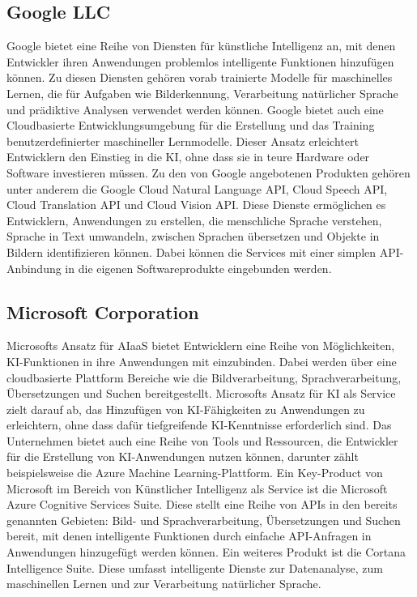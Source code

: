 \subsection{Google LLC}
Google bietet eine Reihe von Diensten für künstliche Intelligenz an, mit denen Entwickler ihren Anwendungen problemlos intelligente Funktionen hinzufügen können. Zu diesen Diensten gehören vorab trainierte Modelle für maschinelles Lernen, die für Aufgaben wie Bilderkennung, Verarbeitung natürlicher Sprache und prädiktive Analysen verwendet werden können. Google bietet auch eine Cloudbasierte Entwicklungsumgebung für die Erstellung und das Training benutzerdefinierter maschineller Lernmodelle. Dieser Ansatz erleichtert Entwicklern den Einstieg in die KI, ohne dass sie in teure Hardware oder Software investieren müssen.
Zu den von Google angebotenen Produkten gehören unter anderem die Google Cloud Natural Language API, Cloud Speech API, Cloud Translation API und Cloud Vision API. Diese Dienste ermöglichen es Entwicklern, Anwendungen zu erstellen, die menschliche Sprache verstehen, Sprache in Text umwandeln, zwischen Sprachen übersetzen und Objekte in Bildern identifizieren können. Dabei können die Services mit einer simplen API-Anbindung in die eigenen Softwareprodukte eingebunden werden. \cite[vgl.][]{GoogleCloud.OA.2022}


\subsection{Microsoft Corporation}
Microsofts Ansatz für AIaaS bietet Entwicklern eine Reihe von Möglichkeiten, KI-Funktionen in ihre Anwendungen mit einzubinden. Dabei werden über eine cloudbasierte Plattform Bereiche wie die Bildverarbeitung, Sprachverarbeitung, Übersetzungen und Suchen bereitgestellt. Microsofts Ansatz für KI als Service zielt darauf ab, das Hinzufügen von KI-Fähigkeiten zu Anwendungen zu erleichtern, ohne dass dafür tiefgreifende KI-Kenntnisse erforderlich sind.  Das Unternehmen bietet auch eine Reihe von Tools und Ressourcen, die Entwickler für die Erstellung von KI-Anwendungen nutzen können, darunter zählt beispielsweise die Azure Machine Learning-Plattform.
Ein Key-Product von Microsoft im Bereich von Künstlicher Intelligenz als Service ist die Microsoft Azure Cognitive Services Suite. Diese stellt eine Reihe von APIs in den bereits genannten Gebieten: Bild- und Sprachverarbeitung, Übersetzungen und Suchen bereit, mit denen intelligente Funktionen durch einfache API-Anfragen in Anwendungen hinzugefügt werden können. Ein weiteres Produkt ist die Cortana Intelligence Suite. Diese umfasst intelligente Dienste zur Datenanalyse, zum maschinellen Lernen und zur Verarbeitung natürlicher Sprache. \cite[vgl.][]{Azure.OA.2022}

